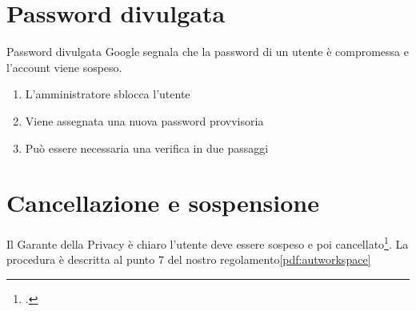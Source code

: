 \section{Password divulgata}
Password divulgata Google segnala che la password di un utente è compromessa e 
l'account viene sospeso.
\begin{enumerate}
	\item L'amministratore sblocca l'utente
	\item Viene assegnata una nuova password provvisoria 
	\item Può essere necessaria una verifica in due passaggi
\end{enumerate}
\section{Cancellazione e sospensione}
Il Garante della Privacy è chiaro l'utente deve essere sospeso e 
poi cancellato\footcite{Garante2019}. La procedura è descritta al punto 7 del nostro regolamento\ref{pdf:autworkspace}
